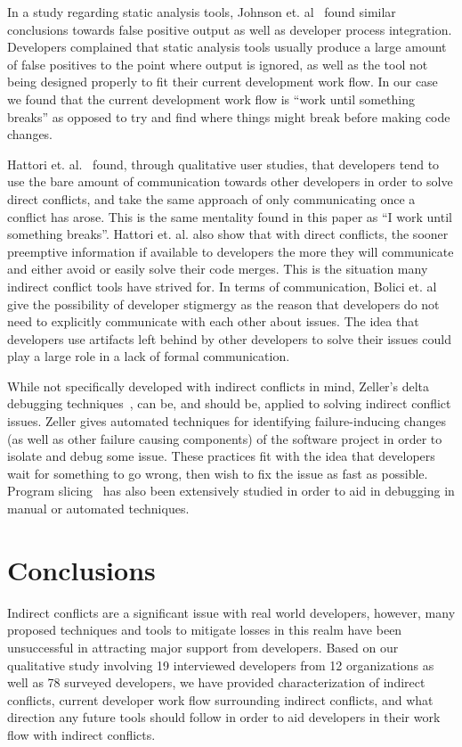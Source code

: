 \documentclass[conference]{IEEEtran}
\begin{document}
In a study regarding static analysis tools, Johnson et. al~\cite{Johnson:2013:WDS} found similar conclusions towards false positive output
as well as developer process integration. Developers complained that static analysis tools usually produce a large amount of false
positives to the point where output is ignored, as well as the tool not being designed properly to fit their current development work
flow. In our case we found that the current development work flow is ``work until something breaks'' as opposed to try and find where things
might break before making code changes.

Hattori et. al.~\cite{Hattori:2012:ICG} found, through qualitative user studies, that developers tend to use the bare amount of communication
towards other developers in order to solve direct conflicts, and take the same approach of only communicating once a conflict has arose. This
is the same mentality found in this paper as ``I work until something breaks''. Hattori et. al. also show that with direct conflicts, the
sooner preemptive information if available to developers the more they will communicate and either avoid or easily solve their code merges.
This is the situation many indirect conflict tools have strived for. In terms of communication, Bolici et. al~\cite{Bolici} give the 
possibility of developer stigmergy as the reason that developers do not need to explicitly communicate with each other about issues. The idea
that developers use artifacts left behind by other developers to solve their issues could play a large role in a lack of formal communication.

While not specifically developed with indirect conflicts in mind, Zeller's delta debugging techniques~\cite{Zeller:2005:WPF}, 
can be, and should be, applied to solving indirect conflict issues. Zeller gives automated techniques for identifying failure-inducing
changes (as well as other failure causing components) of the software project in order to isolate and debug some issue. These practices fit
with the idea that developers wait for something to go wrong, then wish to fix the issue as fast as possible. Program slicing~\cite{Xu:2005:BSP}
has also been extensively studied in order to aid in debugging in manual or automated techniques.

\section{Conclusions}
\label{sec:conc}

Indirect conflicts are a significant issue with real world developers, however, many proposed techniques and tools to mitigate
losses in this realm have been unsuccessful in attracting major support from developers. Based on our qualitative study involving
19 interviewed developers from 12 organizations as well as 78 surveyed developers, we have provided characterization of indirect conflicts,
current developer work flow surrounding indirect conflicts, and what direction any future tools should follow in order to aid developers
in their work flow with indirect conflicts.
\end{document}
